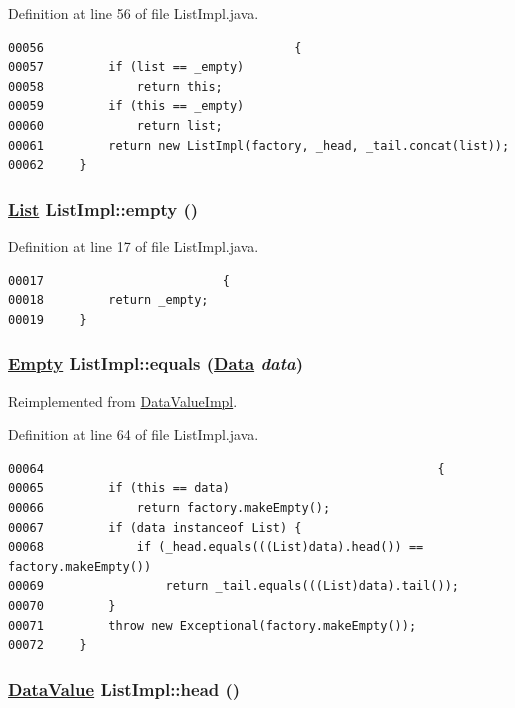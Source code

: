Definition at line 56 of file List\-Impl.java.\footnotesize\begin{verbatim}00056                                   {
00057         if (list == _empty) 
00058             return this;
00059         if (this == _empty)
00060             return list;
00061         return new ListImpl(factory, _head, _tail.concat(list));
00062     }
\end{verbatim}\normalsize 
\hypertarget{classListImpl_f1}{
\subsubsection[empty]{\setlength{\rightskip}{0pt plus 5cm}\hyperlink{interfaceList}{List} List\-Impl::empty ()}}
\label{classListImpl_f1}




Definition at line 17 of file List\-Impl.java.\footnotesize\begin{verbatim}00017                         {
00018         return _empty;
00019     }
\end{verbatim}\normalsize 
\hypertarget{classListImpl_a5}{
\subsubsection[equals]{\setlength{\rightskip}{0pt plus 5cm}\hyperlink{interfaceEmpty}{Empty} List\-Impl::equals (\hyperlink{interfaceData}{Data} {\em data})}}
\label{classListImpl_a5}




Reimplemented from \hyperlink{classDataValueImpl_a5}{Data\-Value\-Impl}.

Definition at line 64 of file List\-Impl.java.\footnotesize\begin{verbatim}00064                                                       {
00065         if (this == data)
00066             return factory.makeEmpty();
00067         if (data instanceof List) {
00068             if (_head.equals(((List)data).head()) == factory.makeEmpty())
00069                 return _tail.equals(((List)data).tail());
00070         }
00071         throw new Exceptional(factory.makeEmpty());
00072     }
\end{verbatim}\normalsize 
\hypertarget{classListImpl_a0}{
\subsubsection[head]{\setlength{\rightskip}{0pt plus 5cm}\hyperlink{interfaceDataValue}{Data\-Value} List\-Impl::head ()}}
\label{classListImpl_a0}





